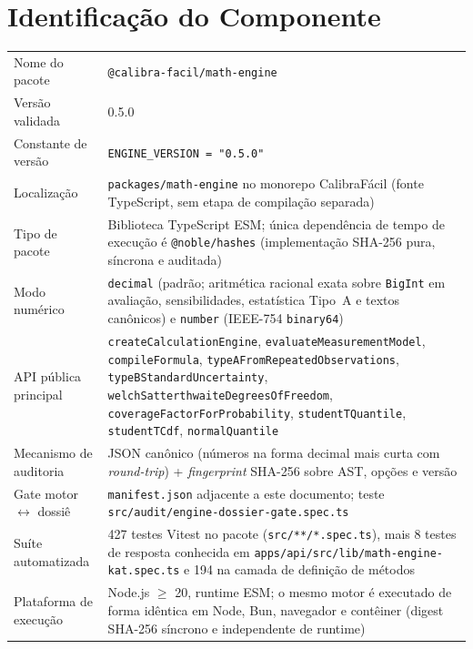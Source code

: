 \documentclass[11pt,a4paper]{article}
\newcommand{\docVersion}{0.5.0}
\begin{document}
\section{Identificação do Componente}

\begin{tabularx}{\textwidth}{l X}
  \toprule
  Nome do pacote          & \texttt{@calibra-facil/math-engine} \\
  Versão validada         & \docVersion \\
  Constante de versão     & \texttt{ENGINE\_VERSION = "\docVersion"} \\
  Localização             & \texttt{packages/math-engine} no monorepo CalibraFácil (fonte TypeScript, sem etapa de compilação separada) \\
  Tipo de pacote          & Biblioteca TypeScript ESM; única dependência de tempo de execução é \texttt{@noble/hashes} (implementação SHA-256 pura, síncrona e auditada) \\
  Modo numérico           & \texttt{decimal} (padrão; aritmética racional exata sobre \texttt{BigInt} em avaliação, sensibilidades, estatística Tipo~A e textos canônicos) e \texttt{number} (IEEE-754 \texttt{binary64}) \\
  API pública principal   & \texttt{createCalculationEngine}, \texttt{evaluateMeasurementModel}, \texttt{compileFormula}, \texttt{typeAFromRepeatedObservations}, \texttt{typeBStandardUncertainty}, \texttt{welchSatterthwaiteDegreesOfFreedom}, \texttt{coverageFactorForProbability}, \texttt{studentTQuantile}, \texttt{studentTCdf}, \texttt{normalQuantile} \\
  Mecanismo de auditoria  & JSON canônico (números na forma decimal mais curta com \emph{round-trip}) + \emph{fingerprint} SHA-256 sobre AST, opções e versão \\
  Gate motor \(\leftrightarrow\) dossiê & \texttt{manifest.json} adjacente a este documento; teste \texttt{src/audit/engine-dossier-gate.spec.ts} \\
  Suíte automatizada      & 427 testes Vitest no pacote (\texttt{src/**/*.spec.ts}), mais 8 testes de resposta conhecida em \texttt{apps/api/src/lib/math-engine-kat.spec.ts} e 194 na camada de definição de métodos \\
  Plataforma de execução  & Node.js \(\geq\) 20, runtime ESM; o mesmo motor é executado de forma idêntica em Node, Bun, navegador e contêiner (digest SHA-256 síncrono e independente de runtime) \\
  \bottomrule
\end{tabularx}
\end{document}

